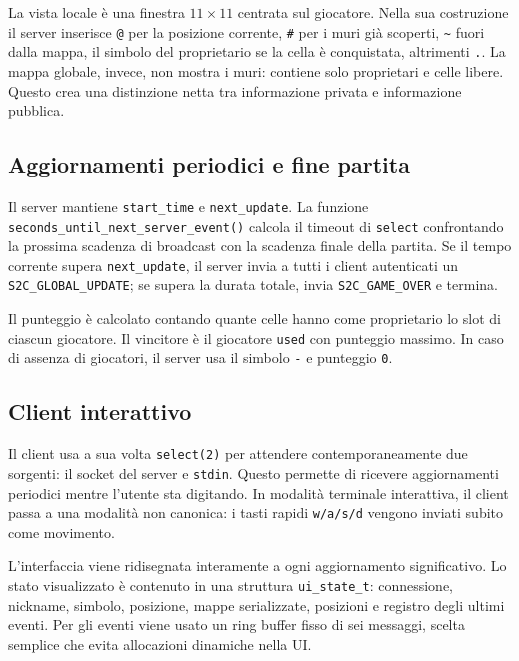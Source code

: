 \documentclass[11pt,a4paper]{article}
\begin{document}
La vista locale è una finestra \(11 \times 11\) centrata sul giocatore. Nella sua costruzione il server inserisce \texttt{@} per la posizione corrente, \texttt{\#} per i muri già scoperti, \texttt{\textasciitilde} fuori dalla mappa, il simbolo del proprietario se la cella è conquistata, altrimenti \texttt{.}. La mappa globale, invece, non mostra i muri: contiene solo proprietari e celle libere. Questo crea una distinzione netta tra informazione privata e informazione pubblica.

\subsection{Aggiornamenti periodici e fine partita}

Il server mantiene \texttt{start\_time} e \texttt{next\_update}. La funzione \texttt{seconds\_until\_next\_server\_event()} calcola il timeout di \texttt{select} confrontando la prossima scadenza di broadcast con la scadenza finale della partita. Se il tempo corrente supera \texttt{next\_update}, il server invia a tutti i client autenticati un \texttt{S2C\_GLOBAL\_UPDATE}; se supera la durata totale, invia \texttt{S2C\_GAME\_OVER} e termina.

Il punteggio è calcolato contando quante celle hanno come proprietario lo slot di ciascun giocatore. Il vincitore è il giocatore \texttt{used} con punteggio massimo. In caso di assenza di giocatori, il server usa il simbolo \texttt{-} e punteggio \texttt{0}.

\subsection{Client interattivo}

Il client usa a sua volta \texttt{select(2)} per attendere contemporaneamente due sorgenti: il socket del server e \texttt{stdin}. Questo permette di ricevere aggiornamenti periodici mentre l'utente sta digitando. In modalità terminale interattiva, il client passa a una modalità non canonica: i tasti rapidi \texttt{w/a/s/d} vengono inviati subito come movimento.

L'interfaccia viene ridisegnata interamente a ogni aggiornamento significativo. Lo stato visualizzato è contenuto in una struttura \texttt{ui\_state\_t}: connessione, nickname, simbolo, posizione, mappe serializzate, posizioni e registro degli ultimi eventi. Per gli eventi viene usato un ring buffer fisso di sei messaggi, scelta semplice che evita allocazioni dinamiche nella UI.
\end{document}

